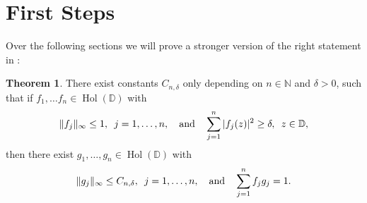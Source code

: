 \documentclass[letterpaper, 11pt]{article}
\newcommand{\D}{\mathbb{D}}
\newcommand{\N}{\mathbb{N}}
\newcommand{\1}{\mathds{1}}
\DeclareMathOperator*{\Hol}{Hol}
\theoremstyle{definition}
\newtheorem{theorem}{Theorem}
\begin{document}
\section{First Steps}

Over the following sections we will prove a stronger version of the right statement in :

\begin{theorem}
  There exist constants $C_{n,\delta}$ only depending on $n \in \N$ and $\delta > 0$, such that if $f_1, \dots f_n \in \Hol(\D)$ with
  $$ \Vert f_j \Vert_\infty \leq 1, \hspace{0.5em} j = 1, \dots, n, \quad \textrm{and} \quad \sum_{j=1}^n \vert f_j(z) \vert^2 \geq \delta, \hspace{0.5em} z \in \D, $$
  then there exist $g_1, \dots, g_n \in \Hol(\D)$ with
  $$ \Vert g_j \Vert_\infty \leq C_{n,\delta}, \hspace{0.5em} j = 1, \dots, n, \quad \textrm{and} \quad \sum_{j=1}^n f_j g_j = 1. $$
\end{theorem}
\end{document}
